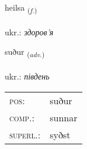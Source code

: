 \documentclass[frontgrid, backgrid]{flacards}\usepackage[]{graphicx}\usepackage[]{xcolor}
\begin{document}
\renewcommand{\flhead}{\vskip5pt \fboxsep=0pt {\small\bfseries\footnotesize Nafnorð | іменник}}
\renewcommand{\fcfoot}{\vskip5pt \fboxsep=0pt \hspace{2pt}{\small\bfseries\footnotesize 2K}}

\renewcommand{\blhead}{\vskip5pt {\small\bfseries\footnotesize Nafnorð | іменник }}
\renewcommand{\bcfoot}{\vskip5pt \hspace{2pt}{\small\bfseries\footnotesize 2K}}


{heilsa \small{\textsubscript{(\textit{f.})}} \\[1ex] %
\textphonetic{[heilsa]} \\
ukr.: \emph{здоров'я} \\  [2ex]
\renewcommand*{\arraystretch}{0.8}
}

\renewcommand{\flhead}{\vskip5pt \fboxsep=0pt {\small\bfseries\footnotesize Atviksorð | прислівник}}
\renewcommand{\fcfoot}{\vskip5pt \fboxsep=0pt \hspace{2pt}{\small\bfseries\footnotesize 2K}}

\renewcommand{\blhead}{\vskip5pt {\small\bfseries\footnotesize Atviksorð | прислівник }}
\renewcommand{\bcfoot}{\vskip5pt \hspace{2pt}{\small\bfseries\footnotesize 2K}}


{suður \small{\textsubscript{(\textit{adv.})}} \\[1ex] %
\textphonetic{[sʏːðʏr]} \\
ukr.: \emph{південь} \\  [2ex]
\renewcommand*{\arraystretch}{0.8}
\begin{tabular}{ll}
\textsc{pos}: & suður \\ 
\textsc{comp.}: & sunnar \\ 
\textsc{superl.}: & syðst \\
\end{tabular}
}
\end{document}
